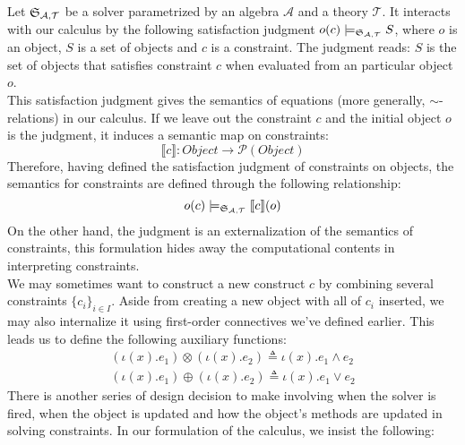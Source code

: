 Let ${\mathfrak{S}_{\mathcal{A},\mathcal{T}}}$ be a solver parametrized by an algebra $\mathcal{A}$ and a theory
$\mathcal{T}$. It interacts with our calculus by the following satisfaction
judgment $o(c) \models_{{\mathfrak{S}_{\mathcal{A},\mathcal{T}}}} S$, where $o$ is an object, $S$ is a set of
objects and $c$ is a constraint. The judgment reads: $S$ is the set of objects that
satisfies constraint $c$ when evaluated from an particular object $o$.\\

This satisfaction judgment gives the semantics of equations (more generally,
$\sim$-relations) in our calculus. If we leave out the constraint $c$ and the
initial object $o$ is the judgment, it induces a semantic map on constraints:
\[
  \llbracket c \rrbracket : Object \to \mathcal{P}(Object)
\]
Therefore, having defined the satisfaction judgment of constraints on objects,
the semantics for constraints are defined through the following relationship:
\[
  o(c) \models_{{\mathfrak{S}_{\mathcal{A},\mathcal{T}}}} \llbracket c \rrbracket (o)
\]
On the other hand, the judgment is an externalization of the semantics of
constraints, this formulation hides away the computational contents in interpreting
constraints.\\

We may sometimes want to construct a new construct $c$ by combining several
constraints $\{c_i\}_{i \in I}$. Aside from creating a new object with all of
$c_i$ inserted, we may also internalize it using first-order connectives we've
defined earlier.  This leads us to define the following auxiliary
functions:
\begin{align*}
  (\iota(x) . e_1) \otimes (\iota(x) . e_2) \triangleq \iota(x) . e_1 \land e_2\\
  (\iota(x) . e_1) \oplus (\iota(x) . e_2) \triangleq \iota(x) . e_1 \vee e_2
\end{align*}
There is another series of design decision to make involving when the solver is
fired, when the object is updated and how the object's methods are updated in
solving constraints. In our formulation of the calculus, we insist the
following:

